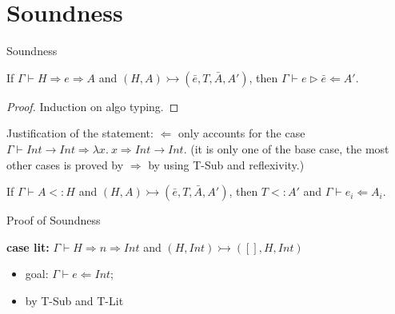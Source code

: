 \section{Soundness}

\begin{frame}{Soundness}

	\begin{lemma}[Soundness]
		If $\Gamma \vdash H \Rightarrow e \Rightarrow A$ and  $(H, A) \rightarrowtail (\bar{e}, T, \bar{A}, A')$, then $\Gamma \vdash e \vartriangleright \bar{e} \Leftarrow A'$.
	\end{lemma}

	\begin{proof}
		Induction on   algo typing.
	\end{proof}

	\noindent\makebox[\linewidth]{\rule{0.9\paperwidth}{0.4pt}}

	Justification of the statement: $\Leftarrow$ only accounts for the case $\Gamma \vdash Int \rightarrow Int \Rightarrow \lambda x. ~x \Rightarrow Int \rightarrow Int$. (it is only one of the base case, the most other cases is proved by $\Rightarrow$ by using T-Sub and reflexivity.)
	
	\begin{lemma}[Soundness (<:)]
	If $\Gamma \vdash A <: H$ and $(H, A) \rightarrowtail (\bar{e}, T, \bar{A}, A')$, then $T <: A'$ and $\Gamma \vdash e_i \Leftarrow A_i$.
	\end{lemma}

\end{frame}

\begin{frame}{Proof of Soundness}

	\textbf{case lit:} $\Gamma \vdash H \Rightarrow n \Rightarrow Int$ and $(H, Int) \rightarrowtail ([], H, Int)$
	\begin{itemize}
		\item goal: $\Gamma \vdash e \Leftarrow Int$;
		\item by T-Sub and T-Lit
	\end{itemize}

\end{frame}

